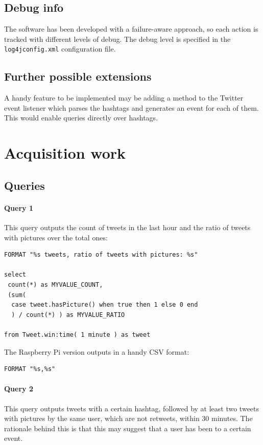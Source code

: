 \documentclass[a4paper]{article}
\begin{document}
\subsection{Debug info}
The software has been developed with a failure-aware approach, so each action is tracked with different levels of debug. The debug level is specified in the \lstinline$log4jconfig.xml$ configuration file.

\subsection{Further possible extensions}
A handy feature to be implemented may be adding a method to the Twitter event listener which parses the hashtags and generates an event for each of them. This would enable queries directly over hashtags.

\pagebreak
\section{Acquisition work}
\subsection{Queries}
\label{sec:queries}
\paragraph{Query 1}
This query outputs the count of tweets in the last hour and the ratio of tweets with pictures over the total ones:

\begin{lstlisting}
FORMAT "%s tweets, ratio of tweets with pictures: %s"

select
 count(*) as MYVALUE_COUNT,
 (sum(
  case tweet.hasPicture() when true then 1 else 0 end 
  ) / count(*) ) as MYVALUE_RATIO 

from Tweet.win:time( 1 minute ) as tweet
\end{lstlisting} \par
The Raspberry Pi version outputs in a handy CSV format:
\begin{lstlisting}
FORMAT "%s,%s"
\end{lstlisting}

\paragraph{Query 2}
This query outputs tweets with a certain hashtag, followed by at least two tweets with pictures by the same user, which are not retweets, within 30 minutes. The rationale behind this is that this may suggest that a user has been to a certain event.
\end{document}
